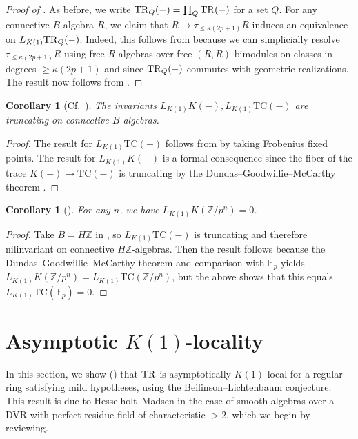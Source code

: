 \documentclass{amsart}
\newtheorem{corollary}[theorem]{Corollary}
\theoremstyle{definition}
\newcommand{\TC}{\mathrm{TC}}
\begin{document}
\begin{proof}[Proof of ] 
As before, we write $\mathrm{TR}_Q(-) = \prod_Q \mathrm{TR}(-)$ for a set $Q$. 
For any connective $B$-algebra $R$, we claim that
$R \to \tau_{\leq \kappa(2p+1)} R$ induces an equivalence on $L_{K(1)}
\mathrm{TR}_Q(-)$. 
Indeed, this follows from  because we can simplicially resolve
$\tau_{\leq \kappa(2p+1)} R$
using free $R$-algebras over free $(R, R)$-bimodules on classes in degrees $\geq
\kappa(2p+1)
$ and since $\mathrm{TR}_Q(-)$ commutes with geometric realizations. 
The result now follows from . 
\end{proof}

\begin{corollary}[Cf.~\cite{LMT}] 
The invariants $L_{K(1)} K(-), L_{K(1)} \TC(-)$ are truncating on connective $B$-algebras. 
\label{LMTtruncating}
\end{corollary} 
\begin{proof} 
The result for $L_{K(1)} \TC(-)$ follows from  by taking
Frobenius fixed points. 
The result for $L_{K(1)} K(-)$ is a formal consequence 
since the fiber of the trace $K(-) \to \TC(-)$
is truncating by the 
Dundas--Goodwillie--McCarthy theorem \cite{DGM}. 
\end{proof} 


\begin{corollary}[\cite{LMT, BCM}] 
For any $n$, we have $L_{K(1)} K(\mathbb{Z}/p^n) = 0$. 
\end{corollary} 
\begin{proof} 
Take $B = H\mathbb{Z}$ in , so $L_{K(1)} \TC(-)$ is truncating
and therefore nilinvariant on connective $H\mathbb{Z}$-algebras. 
Then the result follows because the Dundas--Goodwillie--McCarthy theorem and
comparison with $\mathbb{F}_p$ yields $L_{K(1)}
K(\mathbb{Z}/p^n) = L_{K(1)} \TC(\mathbb{Z}/p^n)$, but the above shows that this
equals
$L_{K(1)} \TC(\mathbb{F}_p) = 0$. 
\end{proof} 



\section{Asymptotic $K(1)$-locality}

In this section, we 
show ()
that  $\mathrm{TR}$ is asymptotically $K(1)$-local for a regular
ring satisfying  mild hypotheses, using the
Beilinson--Lichtenbaum conjecture. 
This result is due to Hesselholt--Madsen in the case of smooth algebras over a
DVR with perfect residue field of characteristic $>2$, which we begin by
reviewing. 
\end{document}

